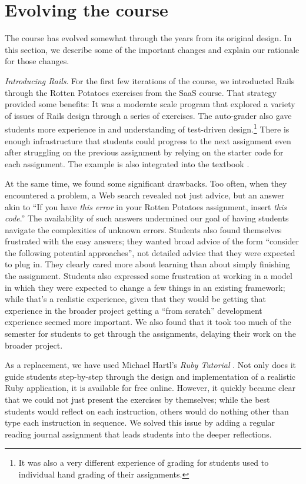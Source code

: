 \section{Evolving the course}

The course has evolved somewhat through the years from its original
design.  In this section, we describe some of the important changes
and explain our rationale for those changes.

\textit{Introducing Rails}.  For the first few iterations of the
course, we introducted Rails through the Rotten Potatoes exercises
from the SaaS course.  That strategy provided some benefits: It was
a moderate scale program that explored a variety of issues of Rails
design through a series of exercises.  The auto-grader also gave
students more experience in and understanding of test-driven
design.\footnote{It was also a very different experience of grading
for students used to individual hand grading of their assignments.}
There is enough infrastructure that students could progress to the
next assignment even after struggling on the previous assignment
by relying on the starter code for each assignment.  The example
is also integrated into the textbook \cite{saasbook}.

At the same time, we found some significant drawbacks.  Too often,
when they encountered a problem, a Web search revealed not just
advice, but an answer akin to ``If you have \textit{this error} in
your Rotten Potatoes assignment, insert \textit{this code}.''  The
availability of such answers undermined our goal of having students
navigate the complexities of unknown errors.  Students also found
themselves frustrated with the easy answers; they wanted broad
advice of the form ``consider the following potential approaches'',
not detailed advice that they were expected to plug in.  They clearly
cared more about learning than about simply finishing the assignment.
Students also expressed some frustration at working in a model in
which they were expected to change a few things in an existing
framework; while that's a realistic experience, given that they
would be getting that experience in the broader project getting a
``from scratch'' development experience seemed more important.
We also found that it took too much of the semester for students 
to get through the assignments, delaying their work on the broader
project.

As a replacement, we have used Michael Hartl's \textit{Ruby Tutorial}
\cite{ruby-tutorial}.  Not only does it guide students step-by-step
through the design and implementation of a realistic Ruby application,
it is available for free online.  However, it quickly became clear
that we could not just present the exercises by themselves; while the 
best students would reflect on each instruction, others would do nothing
other than type each instruction in sequence.  We solved this issue by
adding a regular reading journal assignment that leads students into the
deeper reflections.

